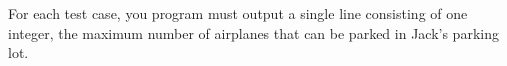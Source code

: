 For each test case, you program must output a single line consisting of one integer, the maximum number of airplanes that can be parked in Jack's parking lot.